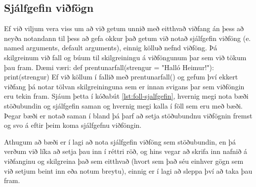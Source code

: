 \subsection{Sjálfgefin viðfögn}\label{uk:föll-sjálfgefin}
Ef við viljum vera viss um að við getum unnið með eitthvað viðfang án þess að neyða notandann til þess að gefa okkur það getum við notað sjálfgefin viðföng (e. named arguments, default arguments), einnig kölluð nefnd viðföng.
Þá skilgreinum við fall og búum til skilgreiningu á viðföngunum þar sem við tökum þau fram.
Dæmi væri:
\newline def prentunarfall(strengur = "Halló Heimur!"): 
\newline \phantom{----}print(strengur)
\newline
Ef við köllum í fallið með prentunarfall() og gefum því ekkert viðfang þá notar tölvan skilgreininguna sem er innan svigans þar sem viðföngin eru tekin fram.
Sjáum þetta í kóðabút \ref{lst:foll-sjalfgefin}, hvernig megi nota bæði stöðubundin og sjálfgefin saman og hvernig megi kalla í föll sem eru með bæði.
Þegar bæði er notað saman í bland þá þarf að setja stöðubundnu viðfögnin fremst og svo á eftir þeim koma sjálfgefnu viðföngin.

Athugum að bæði er í lagi að nota sjálfgefin viðföng sem stöðubundin, en þá verðum við líka að setja þau inn í réttri röð, og hins vegar að skrifa inn nafnið á viðfanginu og skilgreina það sem eitthvað (hvort sem það séu einhver gögn sem við setjum beint inn eða notum breytu), einnig er í lagi að sleppa því að taka þau fram.

